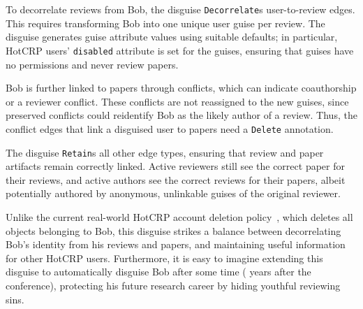 %
To decorrelate reviews from Bob, the disguise \texttt{Decorrelate}s user-to-review edges.
%
This requires transforming Bob into one unique user guise per review.
%
The disguise generates guise attribute values using suitable defaults;
%
in particular, HotCRP users' \texttt{disabled} attribute is set for the guises,
ensuring that guises have no permissions and never review papers.
%

%
Bob is further linked to papers through conflicts, which can indicate coauthorship or a
reviewer conflict.
%
These conflicts are not reassigned to the new guises, since preserved
conflicts could reidentify Bob as the likely author of a review. Thus, the
conflict edges that link a disguised user to papers need a \texttt{Delete} annotation.
%

The disguise \texttt{Retain}s all other edge types, ensuring that review and paper
artifacts remain correctly linked. Active reviewers still see the correct paper for their reviews,
and active authors see the correct reviews for their papers, albeit potentially authored by
anonymous, unlinkable guises of the original reviewer.
%
%

%
Unlike the current real-world HotCRP account deletion policy~\cite{hotcrp:privacy}, which
deletes all objects belonging to Bob, this disguise strikes a balance between decorrelating
Bob's identity from his reviews and papers, and maintaining useful information for other
HotCRP users.
%
Furthermore, it is easy to imagine extending this disguise to automatically disguise Bob
after some time ( years after the conference), protecting his future research career
by hiding youthful reviewing sins.
\fi
